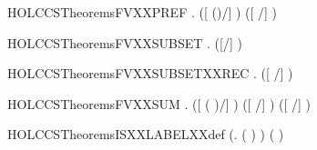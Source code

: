\newcommand{\HOLCCSTheoremsFVXXPAR}{\UseVerbatim{HOLCCSTheoremsFVXXPAR}}
\begin{SaveVerbatim}{HOLCCSTheoremsFVXXPREF}
\HOLTokenTurnstile{} \HOLSymConst{\HOLTokenForall{}}   .  ([  ()/] ) \HOLSymConst{=}  ([  /] )
\end{SaveVerbatim}
\newcommand{\HOLCCSTheoremsFVXXPREF}{\UseVerbatim{HOLCCSTheoremsFVXXPREF}}
\begin{SaveVerbatim}{HOLCCSTheoremsFVXXSUBSET}
\HOLTokenTurnstile{} \HOLSymConst{\HOLTokenForall{}}  .  ([/] ) \HOLConst{\HOLTokenSubset{}}   \HOLConst{\HOLTokenUnion{}}  
\end{SaveVerbatim}
\newcommand{\HOLCCSTheoremsFVXXSUBSET}{\UseVerbatim{HOLCCSTheoremsFVXXSUBSET}}
\begin{SaveVerbatim}{HOLCCSTheoremsFVXXSUBSETXXREC}
\HOLTokenTurnstile{} \HOLSymConst{\HOLTokenForall{}} .  ([  /] ) \HOLConst{\HOLTokenSubset{}}  
\end{SaveVerbatim}
\newcommand{\HOLCCSTheoremsFVXXSUBSETXXREC}{\UseVerbatim{HOLCCSTheoremsFVXXSUBSETXXREC}}
\begin{SaveVerbatim}{HOLCCSTheoremsFVXXSUM}
\HOLTokenTurnstile{} \HOLSymConst{\HOLTokenForall{}}   .
        ([  ( \HOLSymConst{\ensuremath{+}} )/] ) \HOLSymConst{=}
        ([  /] ) \HOLConst{\HOLTokenUnion{}}  ([  /] )
\end{SaveVerbatim}
\newcommand{\HOLCCSTheoremsFVXXSUM}{\UseVerbatim{HOLCCSTheoremsFVXXSUM}}
\begin{SaveVerbatim}{HOLCCSTheoremsISXXLABELXXdef}
\HOLTokenTurnstile{} (\HOLSymConst{\HOLTokenForall{}}.  ( ) \HOLSymConst{\HOLTokenEquiv{}} ) \HOLSymConst{\HOLTokenConj{}} ( \HOLConst{\ensuremath{\tau}} \HOLSymConst{\HOLTokenEquiv{}} )
\end{SaveVerbatim}
